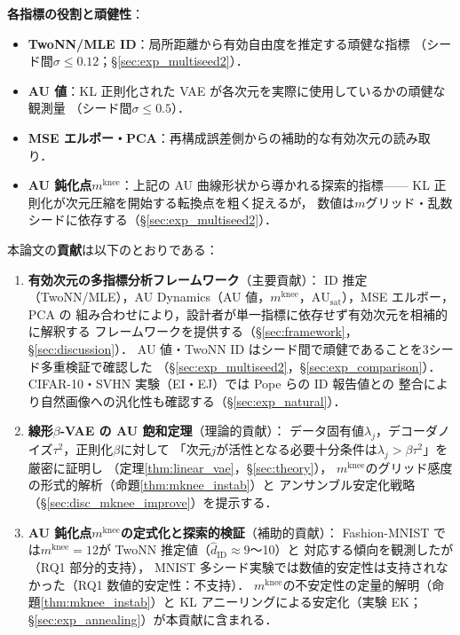 \documentclass[11pt,a4paper]{jsarticle}
\newcommand{\AUsat}{\mathrm{AU}_{\mathrm{sat}}}
\newcommand{\mknee}{m^{\mathrm{knee}}}
\begin{document}
\textbf{各指標の役割と頑健性}：
\begin{itemize}
  \item \textbf{TwoNN/MLE ID}：局所距離から有効自由度を推定する頑健な指標
        （シード間$\sigma \leq 0.12$；§\ref{sec:exp_multiseed2}）．
  \item \textbf{AU 値}：KL 正則化された VAE が各次元を実際に使用しているかの頑健な観測量
        （シード間$\sigma \leq 0.5$）．
  \item \textbf{MSE エルボー・PCA}：再構成誤差側からの補助的な有効次元の読み取り．
  \item \textbf{AU 鈍化点$\mknee$}：上記の AU 曲線形状から導かれる探索的指標——
        KL 正則化が次元圧縮を開始する転換点を粗く捉えるが，
        数値は$m$グリッド・乱数シードに依存する（§\ref{sec:exp_multiseed2}）．
\end{itemize}

本論文の\textbf{貢献}は以下のとおりである：
\begin{enumerate}
  \item \textbf{有効次元の多指標分析フレームワーク}（主要貢献）：
        ID 推定（TwoNN/MLE），AU Dynamics（AU 値，$\mknee$，$\AUsat$），MSE エルボー，PCA の
        組み合わせにより，設計者が単一指標に依存せず有効次元を相補的に解釈する
        フレームワークを提供する（§\ref{sec:framework}，§\ref{sec:discussion}）．
        AU 値・TwoNN ID はシード間で頑健であることを3シード多重検証で確認した
        （§\ref{sec:exp_multiseed2}，§\ref{sec:exp_comparison}）．
        CIFAR-10・SVHN 実験（EI・EJ）では Pope ら\cite{pope2021intrinsic}の ID 報告値との
        整合により自然画像への汎化性も確認する（§\ref{sec:exp_natural}）．
  \item \textbf{線形$\beta$-VAE の AU 飽和定理}（理論的貢献）：
        データ固有値$\lambda_j$，デコーダノイズ$\tau^2$，正則化$\beta$に対して
        「次元$j$が活性となる必要十分条件は$\lambda_j > \beta\tau^2$」を厳密に証明し
        （定理\ref{thm:linear_vae}，§\ref{sec:theory}），
        $\mknee$のグリッド感度の形式的解析（命題\ref{thm:mknee_instab}）と
        アンサンブル安定化戦略（§\ref{sec:disc_mknee_improve}）を提示する．
  \item \textbf{AU 鈍化点$\mknee$の定式化と探索的検証}（補助的貢献）：
        Fashion-MNIST では$\mknee = 12$が TwoNN 推定値（$\hat{d}_\mathrm{ID} \approx 9$〜10）と
        対応する傾向を観測したが（RQ1 部分的支持），
        MNIST 多シード実験では数値的安定性は支持されなかった（RQ1 数値的安定性：不支持）．
        $\mknee$の不安定性の定量的解明（命題\ref{thm:mknee_instab}）と
        KL アニーリングによる安定化（実験 EK；§\ref{sec:exp_annealing}）が本貢献に含まれる．
\end{enumerate}
\end{document}
